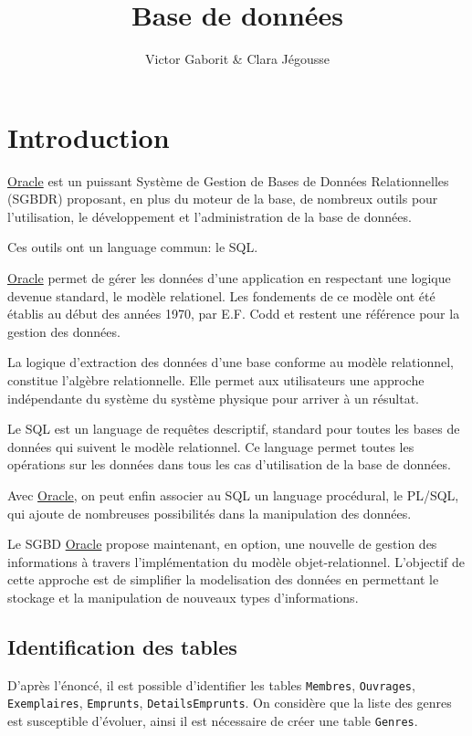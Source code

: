 \documentclass[10pt, oneside]{article}
\title{Base de données}
\author{Victor Gaborit \& Clara Jégousse}
\date{}
\begin{document}
\maketitle
\tableofcontents

\section*{Introduction}

\href{http://www.oracle.com}{Oracle} est un puissant Système de Gestion de Bases de Données Relationnelles (SGBDR) proposant, en plus du moteur de la base, de nombreux outils pour l'utilisation, le développement et l'administration de la base de données.

Ces outils ont un language commun: le SQL.

\href{http://www.oracle.com}{Oracle} permet de gérer les données d'une application en respectant une logique devenue standard, le modèle relationel. Les fondements de ce modèle ont été établis au début des années 1970, par E.F. Codd et restent une référence pour la gestion des données.

La logique d'extraction des données d'une base conforme au modèle relationnel, constitue l'algèbre relationnelle. Elle permet aux utilisateurs une approche indépendante du système du système physique pour arriver à un résultat.

Le SQL est un language de requêtes descriptif, standard pour toutes les bases de données qui suivent le modèle relationnel. Ce language permet toutes les opérations sur les données dans tous les cas d'utilisation de la base de données.

Avec \href{http://www.oracle.com}{Oracle}, on peut enfin associer au SQL un language procédural, le PL/SQL, qui ajoute de nombreuses possibilités dans la manipulation des données.

Le SGBD \href{http://www.oracle.com}{Oracle} propose maintenant, en option, une nouvelle de gestion des informations à travers l'implémentation du modèle objet-relationnel. L'objectif de cette approche est de simplifier la modelisation des données en permettant le stockage et la manipulation de nouveaux types d'informations. 

\subsection*{Identification des tables}

D'après l'énoncé, il est possible d'identifier les tables \texttt{Membres}, \texttt{Ouvrages}, \texttt{Exemplaires}, \texttt{Emprunts}, \texttt{DetailsEmprunts}. On considère que la liste des genres est susceptible d'évoluer, ainsi il est nécessaire de créer une table \texttt{Genres}.
\end{document}
